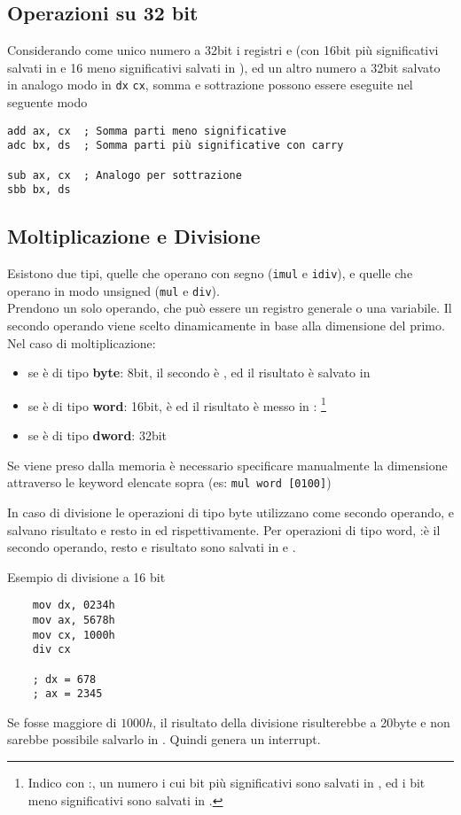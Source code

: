 \documentclass[../template]{subfiles}
\begin{document}
\subsection{Operazioni su 32 bit}
Considerando come unico numero a 32bit i registri \bx e \ax (con 16bit più significativi salvati in \ax e
16 meno significativi salvati in \bx), ed un altro numero a 32bit salvato in analogo modo in \lstinline{dx} \lstinline{cx},
somma e sottrazione possono essere eseguite nel seguente modo
\begin{lstlisting}
add ax, cx  ; Somma parti meno significative
adc bx, ds  ; Somma parti più significative con carry

sub ax, cx  ; Analogo per sottrazione
sbb bx, ds
\end{lstlisting}
\newpage
\subsection{Moltiplicazione e Divisione}
Esistono due tipi, quelle che operano con segno (\lstinline{imul} e \lstinline{idiv}), e quelle che operano in
modo unsigned (\lstinline{mul} e \lstinline{div}).
\\
Prendono un solo operando, che può essere un registro generale o una variabile. Il secondo operando viene scelto dinamicamente
in base alla dimensione del primo. Nel caso di moltiplicazione:

\begin{itemize}
    \item se è di tipo \textbf{byte}: 8bit, il secondo è \al, ed il risultato è salvato in \ax
    \item se è di tipo \textbf{word}: 16bit, è \ax ed il risultato è messo in \dx:\ax
        \footnote{Indico con \ax:\bx, un numero i cui bit più significativi sono salvati in \ax, ed i bit meno significativi sono salvati in \bx.}
    \item se è di tipo \textbf{dword}: 32bit
\end{itemize}
Se viene preso dalla memoria è necessario specificare manualmente la dimensione attraverso le keyword elencate sopra (es: \lstinline{mul word [0100]})

\vspace{10pt}
\noindent
In caso di divisione le operazioni di tipo byte utilizzano \ax come secondo operando, e salvano risultato e resto in \al ed \ah rispettivamente.
Per operazioni di tipo word, \dx:\ax è il secondo operando, resto e risultato sono salvati in \dx e \ax.

\vspace{10pt}
\noindent
Esempio di divisione a 16 bit
\begin{lstlisting}
    mov dx, 0234h
    mov ax, 5678h
    mov cx, 1000h
    div cx

    ; dx = 678
    ; ax = 2345
\end{lstlisting}
Se \dx fosse maggiore di $1000h$, il risultato della divisione risulterebbe a 20byte e non sarebbe possibile salvarlo in \ax. Quindi
genera un interrupt.
\end{document}
